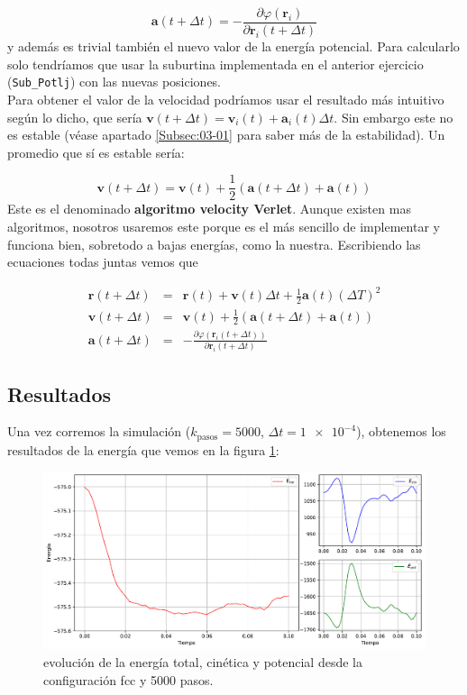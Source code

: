 \documentclass[11pt]{article} %
\newcommand{\parentesis}[1]{\left( #1  \right)}
\newcommand{\parciales}[2]{\frac{\partial #1}{\partial #2}}
\newcommand{\an}{\mathbf{a}}
\newcommand{\rn}{\mathbf{r}}
\newcommand{\vn}{\mathbf{v}}
\begin{document}
\begin{equation}
	\an (t+\Delta t) = - \parciales{\varphi (\rn_i)}{\rn_{i}(t+\Delta t)}
\end{equation}
y además es trivial también el nuevo valor de la energía potencial. Para calcularlo solo tendríamos que usar la suburtina implementada en el anterior ejercicio (\texttt{Sub\_Potlj}) con las nuevas posiciones.  \\

Para obtener el valor de la velocidad podríamos usar el resultado más intuitivo según lo dicho, que sería $\vn(t+\Delta t) = \vn_i (t) + \an_i (t) \Delta t$. Sin embargo este no es estable (véase apartado \ref{Subsec:03-01} para saber más de la estabilidad). Un promedio que sí es estable sería:

\begin{equation}
	\vn(t+\Delta t)  =  \vn(t) + \frac{1}{2} \parentesis{\an(t+\Delta t)+ \an(t)} 
\end{equation}
Este es el denominado \textbf{algoritmo velocity Verlet}. Aunque existen mas algoritmos, nosotros usaremos este porque es el más sencillo de implementar y funciona bien, sobretodo a bajas energías, como la nuestra. Escribiendo las ecuaciones todas juntas vemos que

\begin{eqnarray*}
	\rn(t+\Delta t) & = & \rn(t) + \vn(t) \Delta t + \frac{1}{2} \an (t) (\Delta T)^2 \\
	\vn(t+\Delta t) & = & \vn(t) + \frac{1}{2} \parentesis{\an(t+\Delta t)+ \an(t)} \\
	\an(t+\Delta t) & = &  - \parciales{\varphi(\rn_i (t+\Delta t))}{\rn_i (t+\Delta t)}
\end{eqnarray*}




\subsection{Resultados}

Una vez corremos la simulación ($k_{\text{pasos}}=5000$, $\Delta t=\num{1e-4}$), obtenemos los resultados de la energía que vemos en la figura \ref{Fig:01}:
\begin{figure}[h!] \centering
	\includegraphics[width=1.0\textwidth]{../../Graficas/Et-equilibra.pdf}
	\caption{evolución de la energía total, cinética y potencial desde la configuración fcc y 5000 pasos.}
	\label{Fig:01}
\end{figure}	
\end{document}
